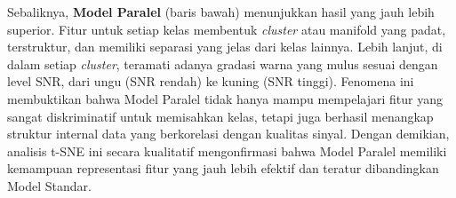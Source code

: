 \documentclass{article}
\begin{document}
Sebaliknya, \textbf{Model Paralel} (baris bawah) menunjukkan hasil yang jauh lebih superior. Fitur untuk setiap kelas membentuk \textit{cluster} atau manifold yang padat, terstruktur, dan memiliki separasi yang jelas dari kelas lainnya. 
Lebih lanjut, di dalam setiap \textit{cluster}, teramati adanya gradasi warna yang mulus sesuai dengan level SNR, dari ungu (SNR rendah) ke kuning (SNR tinggi). 
Fenomena ini membuktikan bahwa Model Paralel tidak hanya mampu mempelajari fitur yang sangat diskriminatif untuk memisahkan kelas, tetapi juga berhasil menangkap struktur internal data yang berkorelasi dengan kualitas sinyal. 
Dengan demikian, analisis t-SNE ini secara kualitatif mengonfirmasi bahwa Model Paralel memiliki kemampuan representasi fitur yang jauh lebih efektif dan teratur dibandingkan Model Standar.
\end{document}
